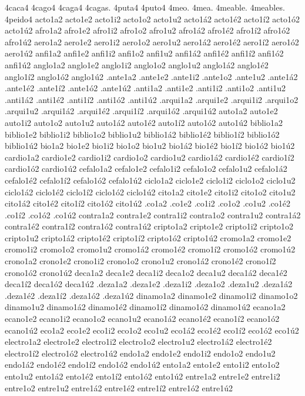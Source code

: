 {%
4caca4 4cago4 4caga4 4cagas. 4puta4 4puto4 4meo. 4mea.
4meable. 4meables. 4peido4
%
acto1a2 acto1e2 acto1i2 acto1o2 acto1u2 acto1á2 acto1é2 acto1í2 acto1ó2 acto1ú2
afro1a2 afro1e2 afro1i2 afro1o2 afro1u2 afro1á2 afro1é2 afro1í2 afro1ó2 afro1ú2
aero1a2 aero1e2 aero1i2 aero1o2 aero1u2 aero1á2 aero1é2 aero1í2 aero1ó2 aero1ú2
anfi1a2 anfi1e2 anfi1i2 anfi1o2 anfi1u2 anfi1á2 anfi1é2 anfi1í2 anfi1ó2 anfi1ú2
anglo1a2 anglo1e2 anglo1i2 anglo1o2 anglo1u2 anglo1á2 anglo1é2 anglo1í2 anglo1ó2 anglo1ú2
.ante1a2 .ante1e2 .ante1i2 .ante1o2 .ante1u2 .ante1á2 .ante1é2 .ante1í2 .ante1ó2 .ante1ú2
.anti1a2 .anti1e2 .anti1i2 .anti1o2 .anti1u2 .anti1á2 .anti1é2 .anti1í2 .anti1ó2 .anti1ú2
.arqui1a2 .arqui1e2 .arqui1i2 .arqui1o2 .arqui1u2 .arqui1á2 .arqui1é2 .arqui1í2 .arqui1ó2 .arqui1ú2
auto1a2 auto1e2 auto1i2 auto1o2 auto1u2 auto1á2 auto1é2 auto1í2 auto1ó2 auto1ú2
biblio1a2 biblio1e2 biblio1i2 biblio1o2 biblio1u2 biblio1á2 biblio1é2 biblio1í2 biblio1ó2 biblio1ú2
bio1a2 bio1e2 bio1i2 bio1o2 bio1u2 bio1á2 bio1é2 bio1í2 bio1ó2 bio1ú2
cardio1a2 cardio1e2 cardio1i2 cardio1o2 cardio1u2 cardio1á2 cardio1é2 cardio1í2 cardio1ó2 cardio1ú2
cefalo1a2 cefalo1e2 cefalo1i2 cefalo1o2 cefalo1u2 cefalo1á2 cefalo1é2 cefalo1í2 cefalo1ó2 cefalo1ú2
ciclo1a2 ciclo1e2 ciclo1i2 ciclo1o2 ciclo1u2 ciclo1á2 ciclo1é2 ciclo1í2 ciclo1ó2 ciclo1ú2
cito1a2 cito1e2 cito1i2 cito1o2 cito1u2 cito1á2 cito1é2 cito1í2 cito1ó2 cito1ú2
.co1a2 .co1e2 .co1i2 .co1o2 .co1u2         .co1é2 .co1í2 .co1ó2 .co1ú2
contra1a2 contra1e2 contra1i2 contra1o2 contra1u2 contra1á2 contra1é2 contra1í2 contra1ó2 contra1ú2
cripto1a2 cripto1e2 cripto1i2 cripto1o2 cripto1u2 cripto1á2 cripto1é2 cripto1í2 cripto1ó2 cripto1ú2
cromo1a2 cromo1e2 cromo1i2 cromo1o2 cromo1u2 cromo1á2 cromo1é2 cromo1í2 cromo1ó2 cromo1ú2
crono1a2 crono1e2 crono1i2 crono1o2 crono1u2 crono1á2 crono1é2 crono1í2 crono1ó2 crono1ú2
deca1a2 deca1e2 deca1i2 deca1o2 deca1u2 deca1á2 deca1é2 deca1í2 deca1ó2 deca1ú2
.deza1a2 .deza1e2 .deza1i2 .deza1o2 .deza1u2 .deza1á2 .deza1é2 .deza1í2 .deza1ó2 .deza1ú2
dinamo1a2 dinamo1e2 dinamo1i2 dinamo1o2 dinamo1u2 dinamo1á2 dinamo1é2 dinamo1í2 dinamo1ó2 dinamo1ú2
ecano1a2 ecano1e2 ecano1i2 ecano1o2 ecano1u2 ecano1á2 ecano1é2 ecano1í2 ecano1ó2 ecano1ú2
eco1a2 eco1e2 eco1i2 eco1o2 eco1u2 eco1á2 eco1é2 eco1í2 eco1ó2 eco1ú2
electro1a2 electro1e2 electro1i2 electro1o2 electro1u2 electro1á2 electro1é2 electro1í2 electro1ó2 electro1ú2
endo1a2 endo1e2 endo1i2 endo1o2 endo1u2 endo1á2 endo1é2 endo1í2 endo1ó2 endo1ú2
ento1a2 ento1e2 ento1i2 ento1o2 ento1u2 ento1á2 ento1é2 ento1í2 ento1ó2 ento1ú2
entre1a2 entre1e2 entre1i2 entre1o2 entre1u2 entre1á2 entre1é2 entre1í2 entre1ó2 entre1ú2
}
